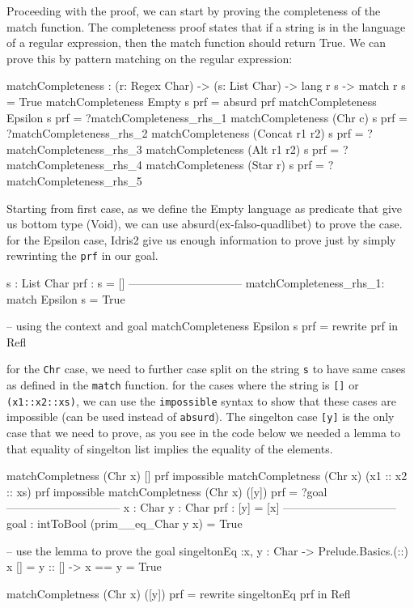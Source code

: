 \documentclass[]{rptuseminar}
\begin{document}
Proceeding with the proof, we can start by proving the completeness of the match function. The completeness proof states that if a string is in the language of a regular expression, then the match function should return True. We can prove this by pattern matching on the regular expression:
\begin{idris}
  matchCompleteness : (r: Regex Char) -> (s: List Char) ->
   lang r s -> match r s = True
  matchCompleteness Empty s prf = absurd prf
  matchCompleteness Epsilon s prf = ?matchCompleteness_rhs_1
  matchCompleteness (Chr c) s prf = ?matchCompleteness_rhs_2
  matchCompleteness (Concat r1 r2) s prf = ?matchCompleteness_rhs_3
  matchCompleteness (Alt r1 r2) s prf = ?matchCompleteness_rhs_4
  matchCompleteness (Star r) s prf = ?matchCompleteness_rhs_5
\end{idris}
Starting from first case, as we define the Empty language as predicate that give us bottom type (Void), we can use absurd(ex-falso-quadlibet) to prove the case.
for the Epsilon case, Idris2 give us enough information to prove just by simply rewrinting the \texttt{prf} in our goal.
\begin{idris}
  s : List Char
    prf : s = []
  ------------------------------
  matchCompleteness_rhs_1: match Epsilon s = True

  -- using the context and goal
  matchCompleteness Epsilon s prf = rewrite prf in Refl
\end{idris}
for the \texttt{Chr} case, we need to further case split on the string \texttt{s} to have same cases as defined in the \texttt{match} function.
for the cases where the string is \texttt{[]} or \texttt{(x1::x2::xs)}, we can use the \texttt{impossible} syntax to show that these cases are impossible (can be used instead of \texttt{absurd}).
The singelton case \texttt{[y]} is the only case that we need to prove, as you see in the code below we needed a lemma to that equality of singelton list implies the equality of the elements.
\begin{idris}
  matchCompletness (Chr x) [] prf impossible 
  matchCompletness (Chr x) (x1 :: x2 :: xs) prf impossible 
  matchCompletness (Chr x) ([y]) prf =  ?goal
  ------------------------------
  x : Char
  y : Char
  prf : [y] = [x]
  ------------------------------
  goal : intToBool (prim__eq_Char y x) = True

  -- use the lemma to prove the goal
  singeltonEq :{x, y : Char} ->  Prelude.Basics.(::) x [] = y :: [] -> x == y = True

  matchCompletness (Chr x) ([y]) prf = rewrite singeltonEq prf in Refl
\end{idris}
\end{document}
